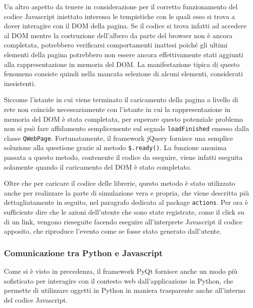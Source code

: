 \documentclass[12pt]{toptesi}
\begin{document}


Un altro aspetto da tenere in considerazione per il corretto funzionamento del codice Javascript iniettato interessa le tempistiche con le quali esso si trova a dover interagire con il DOM della pagina. Se il codice si trova infatti ad accedere al DOM mentre la costruzione dell'albero da parte del browser non è ancora completata, potrebbero verificarsi comportamenti inattesi poiché gli ultimi elementi della pagina potrebbero non essere ancora effettivamente stati aggiunti alla rappresentazione in memoria del DOM. La manifestazione tipica di questo fenomeno consiste quindi nella mancata selezione di alcuni elementi, considerati inesistenti. 

Siccome l'istante in cui viene terminato il caricamento della pagina a livello di rete non coincide necessariamente con l'istante in cui la rappresentazione in memoria del DOM è stata completata, per superare questo potenziale problema non si può fare affidamento semplicemente sul segnale \verb|loadFinished| emesso dalla classe \verb|QWebPage|. Fortunatamente, il framework jQuery fornisce una semplice soluzione alla questione grazie al metodo  \verb|$.ready()|. La funzione anonima passata a questo metodo, contenente il codice da eseguire, viene infatti eseguita solamente quando il caricamento del DOM è stato completato.

Oltre che per caricare il codice delle librerie, questo metodo è stato utilizzato anche per realizzare la parte di simulazione vera e propria, che viene descritta più dettagliatamente in seguito, nel paragrafo dedicato al package \verb|actions|. Per ora è sufficiente dire che le azioni dell'utente che sono state registrate, come il click su di un link, vengono rieseguite facendo eseguire all'interprete Javascript il codice apposito, che riproduce l'evento come se fosse stato generato dall'utente.

\subsubsection{Comunicazione tra Python e Javascript}

Come si è visto in precedenza, il framework PyQt fornisce anche un modo più sofisticato per interagire con il contesto web dall'applicazione in Python, che permette di utilizzare oggetti in Python in maniera trasparente anche all'interno del codice Javascript.
\end{document}
